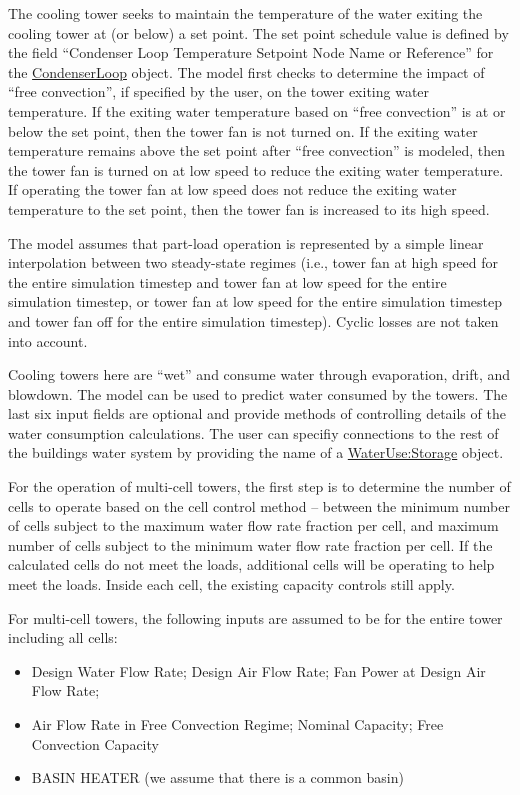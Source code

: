 The cooling tower seeks to maintain the temperature of the water exiting the cooling tower at (or below) a set point. The set point schedule value is defined by the field ``Condenser Loop Temperature Setpoint Node Name or Reference'' for the \hyperref[condenserloop]{CondenserLoop} object. The model first checks to determine the impact of ``free convection'', if specified by the user, on the tower exiting water temperature. If the exiting water temperature based on ``free convection'' is at or below the set point, then the tower fan is not turned on. If the exiting water temperature remains above the set point after ``free convection'' is modeled, then the tower fan is turned on at low speed to reduce the exiting water temperature. If operating the tower fan at low speed does not reduce the exiting water temperature to the set point, then the tower fan is increased to its high speed.

The model assumes that part-load operation is represented by a simple linear interpolation between two steady-state regimes (i.e., tower fan at high speed for the entire simulation timestep and tower fan at low speed for the entire simulation timestep, or tower fan at low speed for the entire simulation timestep and tower fan off for the entire simulation timestep). Cyclic losses are not taken into account.

Cooling towers here are ``wet'' and consume water through evaporation, drift, and blowdown. The model can be used to predict water consumed by the towers. The last six input fields are optional and provide methods of controlling details of the water consumption calculations. The user can specifiy connections to the rest of the buildings water system by providing the name of a \hyperref[waterusestorage]{WaterUse:Storage} object.

For the operation of multi-cell towers, the first step is to determine the number of cells to operate based on the cell control method -- between the minimum number of cells subject to the maximum water flow rate fraction per cell, and maximum number of cells subject to the minimum water flow rate fraction per cell. If the calculated cells do not meet the loads, additional cells will be operating to help meet the loads. Inside each cell, the existing capacity controls still apply.

For multi-cell towers, the following inputs are assumed to be for the entire tower including all cells:

\begin{itemize}
\item
  Design Water Flow Rate; Design Air Flow Rate; Fan Power at Design Air Flow Rate;
\item
  Air Flow Rate in Free Convection Regime; Nominal Capacity; Free Convection Capacity
\item
  BASIN HEATER (we assume that there is a common basin)
\end{itemize}


